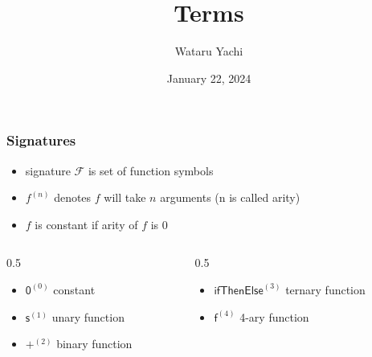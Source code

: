 \documentclass[12pt,aspectratio=169]{beamer}
\title{ Terms }
\author{Wataru Yachi}
\institute{JAIST}
\date{January 22, 2024}
\newcommand{\m}[1]{\mathsf{#1}}
\newcommand{\FF}{\mathcal{F}}
\newlength{\mytotalwidth}
\newlength{\mycolumnwidth}
\begin{document}
\maketitle

\begin{frame}
    \frametitle{Signatures}
    \begin{definition}
        \begin{itemize}
            \item \alert{signature} $\FF$ is set of function symbols
            \item \alert{$f^{(n)}$} denotes $f$ will take $n$ arguments (n is called \alert{arity})
            \item $f$ is \alert{constant} if arity of $f$ is 0
        \end{itemize}
    \end{definition}
    
    \pause
    \begin{example}
        \begin{columns}[totalwidth=\mytotalwidth]
        \begin{column}[t]{0.5\mycolumnwidth}
            \begin{itemize}
                \pause
            \item $\mathsf{0}^{(0)}$ \quad \alert{constant}
                \pause
            \item $\m{s}^{(1)}$ \quad \alert{unary function}
                \pause
            \item $\m{+}^{(2)}$ \quad \alert{binary function}
            \end{itemize}
        \end{column}
        \begin{column}[t]{0.5\mycolumnwidth}
            \begin{itemize}
                \pause
            \item $\m{ifThenElse}^{(3)}$ \quad \alert{ternary function}
                \pause
            \item $\m{f}^{(4)}$ \quad \alert{4-ary function}
            \end{itemize}
        \end{column}
        \end{columns}
    \end{example}
\end{frame}
\end{document}
